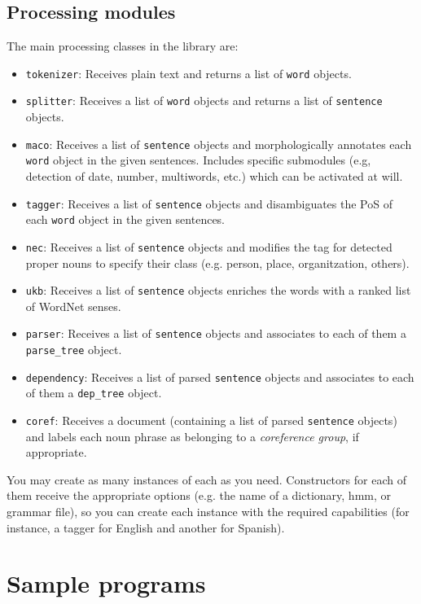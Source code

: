 \documentclass[a4paper]{book}
\begin{document}
\subsection{Processing modules}

  The main processing classes in the library are:
\begin{itemize}
\itemsep 0cm
\item {\tt tokenizer}: Receives plain text and returns a list of {\tt word} objects.
\item {\tt splitter}: Receives a list of {\tt word} objects and
  returns a list of {\tt sentence} objects.
\item {\tt maco}: Receives a list of {\tt sentence} objects and
  morphologically annotates each {\tt word} object in the given
  sentences. Includes specific submodules (e.g, detection of date,
  number, multiwords, etc.) which can be activated at will.
\item {\tt tagger}: Receives a list of {\tt sentence} objects and
  disambiguates the PoS of each {\tt word} object in the given
  sentences.
\item {\tt nec}: Receives a list of {\tt sentence} objects and 
  modifies the tag for detected proper nouns to specify their class
  (e.g. person, place, organitzation, others).
\item {\tt ukb}:  Receives a list of {\tt sentence} objects 
  enriches the words with a ranked list of WordNet senses.
\item {\tt parser}: Receives a list of {\tt sentence} objects and
  associates to each of them a {\tt parse\_tree} object.
\item {\tt dependency}: Receives a list of parsed {\tt sentence}
 objects and associates to each of them a {\tt dep\_tree} object.
\item {\tt coref}: Receives a document (containing a list of parsed
  {\tt sentence} objects) and labels each noun phrase as belonging
  to a {\em coreference group}, if appropriate.
\end{itemize}

  You may create as many instances of each as you need. 
  Constructors for each of them receive the appropriate options
  (e.g. the name of a dictionary, hmm, or grammar file), so you can 
  create each instance with the required capabilities (for instance,
  a tagger for English and another for Spanish).

\section{Sample programs}
\label{sec-main}
\end{document}
